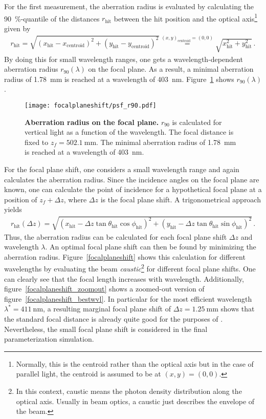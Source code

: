 For the first measurement, the aberration radius is evaluated by calculating the \SI{90}{\percent}-quantile of the distances $r_\text{hit}$ between the hit position and the optical axis\footnote{Normally, this is the centroid rather than the optical axis but in the case of parallel light, the centroid is assumed to be at $(x,y) = (0,0)$.} given by
\begin{align}
	r_\text{hit} = \sqrt{\left(x_\text{hit}-x_\text{centroid}\right)^2+\left(y_\text{hit}-y_\text{centroid}\right)^2} \overset{(x,y)_\text{centroid}=(0,0)}{=}\sqrt{x_\text{hit}^2+y_\text{hit}^2}\,.
\end{align}
By doing this for small wavelength ranges, one gets a wavelength-dependent aberration radius $r_{90}(\lambda)$ on the focal plane. As a result, a minimal aberration radius of \SI{1.78}{\milli\meter} is reached at a wavelength of \SI{403}{\nano\meter}. Figure~\ref{psf_at_focal_plane} shows $r_{90}(\lambda)$.\\

\begin{figure}[H]
	\centering
	\texttt{[image: focalplaneshift/psf\_r90.pdf]}
	\caption[Aberration radius on the focal plane]{\textbf{Aberration radius on the focal plane.} $r_{90}$ is calculated for vertical light as a function of the wavelength. The focal distance is fixed to $z_f=\SI{502.1}{\milli\meter}$. The minimal aberration radius of \SI{1.78}{\milli\meter} is reached at a wavelength of \SI{403}{\nano\meter}.}
	\label{psf_at_focal_plane}
\end{figure}

For the focal plane shift, one considers a small wavelength range and again calculates the aberration radius. Since the incidence angles on the focal plane are known, one can calculate the point of incidence for a hypothetical focal plane at a position of $z_f+\Delta z$, where $\Delta z$ is the focal plane shift. A trigonometrical approach yields
\begin{align}
	r_\text{hit}(\Delta z) = \sqrt{\left(x_\text{hit}-\Delta z\tan\theta_\text{hit}\cos\phi_\text{hit}\right)^2 + \left(y_\text{hit}-\Delta z\tan\theta_\text{hit}\sin\phi_\text{hit}\right)^2}\,.
\end{align}
Thus, the aberration radius can be calculated for each focal plane shift $\Delta z$ and wavelength $\lambda$. An optimal focal plane shift can then be found by minimizing the aberration radius. Figure~\ref{focalplaneshift} shows this calculation for different wavelengths by evaluating the beam \textit{caustic}\footnote{In this context, caustic means the photon density distribution along the optical axis. Usually in beam optics, a caustic just describes the envelope of the beam.} for different focal plane shifts. One can clearly see that the focal length increases with wavelength. Additionally, figure~\ref{focalplaneshift_zoomout} shows a zoomed-out version of figure~\ref{focalplaneshift_bestwvl}. In particular for the most efficient wavelength $\lambda^\ast=\SI{411}{\nano\meter}$, a resulting marginal focal plane shift of $\Delta z=\SI{1.25}{\milli\meter}$ shows that the standard focal distance is already quite good for the purposes of \iceact. Nevertheless, the small focal plane shift is considered in the final parameterization simulation.

